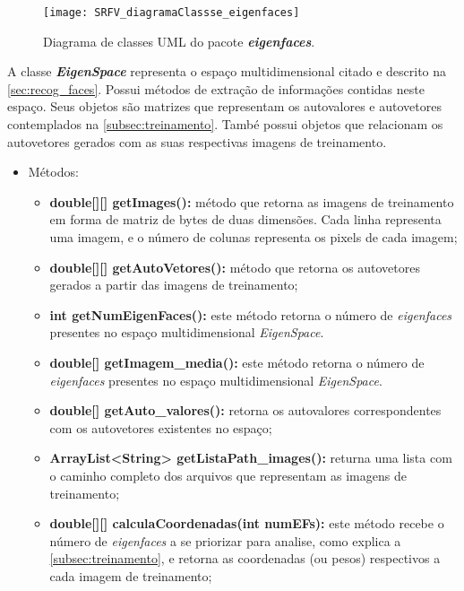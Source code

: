 \begin{figure}[h]
	\centering
	\texttt{[image: SRFV\_diagramaClassse\_eigenfaces]}
	\caption{Diagrama de classes UML do pacote \textbf{\textit{eigenfaces}}.}
	\label{figSRFV_diagramaClassse_eigenfaces}
\end{figure}


A classe \textit{\textbf{EigenSpace}} representa o espaço multidimensional citado e descrito na  \autoref{sec:recog_faces}. Possui métodos de extração de informações contidas neste espaço. Seus objetos são matrizes que representam os autovalores e autovetores contemplados na \autoref{subsec:treinamento}. També possui objetos que relacionam os autovetores gerados com as suas respectivas imagens de treinamento.


\begin{itemize}	
	\item Métodos:
	\begin{itemize}
		\item \textbf{double[][] getImages():} método que retorna as imagens de treinamento em forma de matriz de bytes de duas dimensões. Cada linha representa uma imagem, e o número de colunas representa os pixels de cada imagem;
		
		\item \textbf{double[][] getAutoVetores():} método que retorna os autovetores gerados a partir das imagens de treinamento;
		
		\item \textbf{int getNumEigenFaces():} este método retorna o número de \textit{eigenfaces} presentes no espaço multidimensional \textit{EigenSpace}.
		
		\item \textbf{double[] getImagem\_media():} este método retorna o número de \textit{eigenfaces} presentes no espaço multidimensional \textit{EigenSpace}.
		
		\item \textbf{double[] getAuto\_valores():} retorna os autovalores correspondentes com os autovetores existentes no espaço;
		
		
		\item \textbf{ArrayList<String> getListaPath\_images():} returna uma lista com o caminho completo dos arquivos que representam as imagens de treinamento;
		
		\item \textbf{double[][] calculaCoordenadas(int numEFs):} este método recebe o número de \textit{eigenfaces} a se priorizar para analise, como explica a \autoref{subsec:treinamento}, e retorna as coordenadas (ou pesos) respectivos a cada imagem de treinamento;		
	
	\end{itemize}
\end{itemize}

